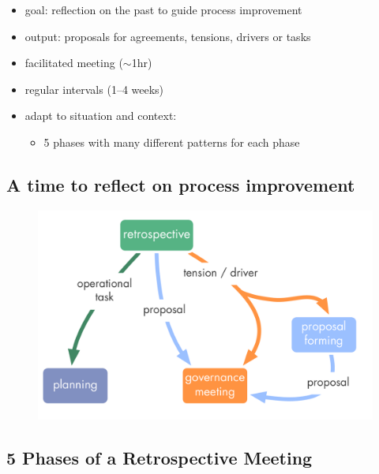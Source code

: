 \begin{itemize}
\item goal: reflection on the past to guide process improvement

\item output: proposals for agreements, tensions, drivers or tasks

\item facilitated meeting (\ensuremath{\sim}1hr)

\item regular intervals (1--4 weeks)

\item adapt to situation and context:

\begin{itemize}
\item 5 phases with many different patterns for each phase

\end{itemize}

\end{itemize}

\subsection{A time to reflect on process improvement}
\label{atimetoreflectonprocessimprovement}

\begin{figure}[htbp]
\centering
\includegraphics[keepaspectratio,width=\textwidth,height=0.75\textheight]{img/meetings/retrospective.png}
\end{figure}

\subsection{5 Phases of a Retrospective Meeting}
\label{5phasesofaretrospectivemeeting}

